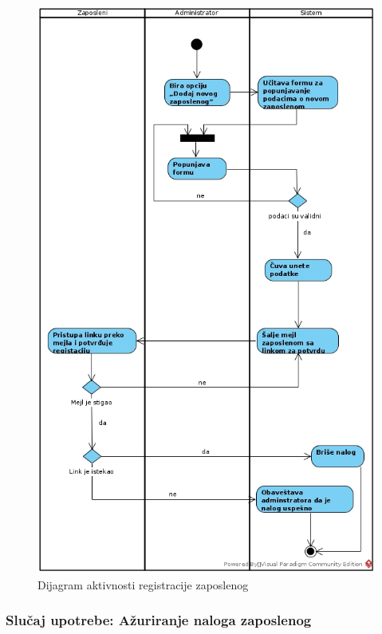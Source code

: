 \documentclass[a4paper]{article}
\begin{document}
\begin{figure}[!ht]
\begin{center}
\includegraphics[scale=0.52]{sections/images/dijagram_aktivnosti_registracije_zaposlenog.jpg}
\end{center}
\caption{Dijagram aktivnosti registracije zaposlenog}
\label{fig:kontekst}
\end{figure}

\subsubsection{Slučaj upotrebe: Ažuriranje naloga zaposlenog}

\end{document}
